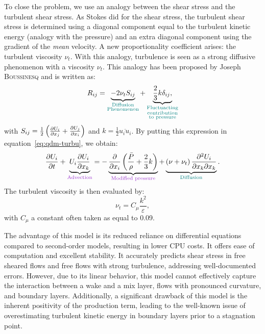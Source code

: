 To close the problem, we use an analogy between the shear stress and the turbulent shear stress. As Stokes did for the shear stress, the turbulent shear stress is determined using a diagonal component equal to the turbulent kinetic energy (analogy with the pressure) and an extra diagonal component using the gradient of the \emph{mean} velocity. A new proportionality coefficient arises: the turbulent viscosity $\nu_t$. With this analogy, turbulence is seen as a strong diffusive phenomenon with a viscosity $\nu_t$. This analogy has been proposed by Joseph \textsc{Boussinesq} and is written as:
\begin{equation}
    R_{ij}=\underbrace{-2\nu_tS_{ij}}_{\color{myteal}\substack{\text{Diffusion}\\\text{Phenomenon}}} + \underbrace{\frac{2}{3}k\delta_{ij},}_{\color{myteal}\substack{\text{Fluctuacting}\\\text{contribution}\\\text{to pressure}}}
\end{equation}
with $S_{ij}=\frac{1}{2}\left( \tfrac{\partial U_i}{\partial x_j}+\tfrac{\partial U_j}{\partial x_i} \right)$ and $k=\tfrac{1}{2}\overline{u_iu_i}$. By putting this expression in equation~\ref{eq:qdm-turbu}, we obtain:
\begin{equation}\label{turbu}
        \frac{\partial U_i}{\partial t}+\underbrace{U_i\frac{\partial U_i}{\partial x_k}}_{\color{mydarkorchid}\text{Advection}} = - \underbrace{\frac{\partial }{\partial x_i}\parent{\frac{\bar{P}}{\rho}+\frac{2}{3}k}}_{\color{mydarkorchid}\text{Modified pressure}} + \underbrace{\parent{\nu+\nu_t} \frac{\partial^2 U_i}{\partial x_k \partial x_k}}_{\color{myteal}\text{Diffusion}}.
\end{equation}
The turbulent viscosity is then evaluated by:
\begin{equation}
    \nu_t=C_\mu\frac{k^2}{\varepsilon},
\end{equation}
with $C_\mu$ a constant often taken as equal to 0.09.

The advantage of this model is its reduced reliance on differential equations compared to second-order models, resulting in lower CPU costs. It offers ease of computation and excellent stability. It accurately predicts shear stress in free sheared flows and free flows with strong turbulence, addressing well-documented errors. However, due to its linear behavior, this model cannot effectively capture the interaction between a wake and a mix layer, flows with pronounced curvature, and boundary layers. Additionally, a significant drawback of this model is the inherent positivity of the production term, leading to the well-known issue of overestimating turbulent kinetic energy in boundary layers prior to a stagnation point.

